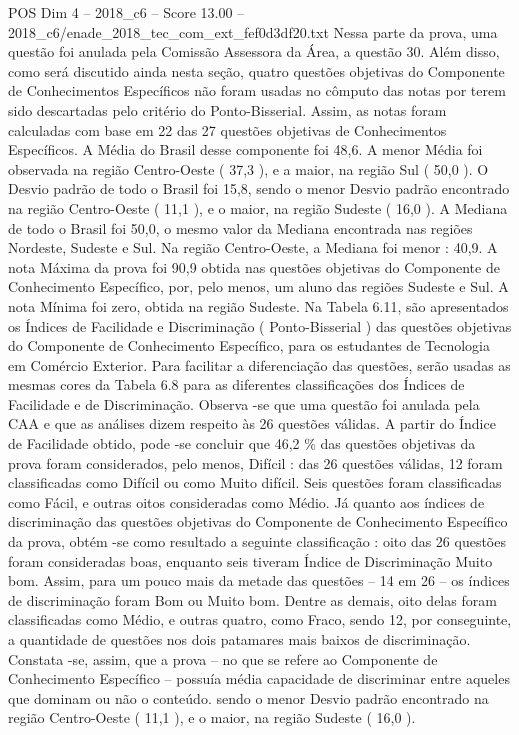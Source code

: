 \begin{textsample}{POS Dim 4 – 2018\_c6 – Score 13.00 – 2018\_c6/enade\_2018\_tec\_com\_ext\_fef0d3df20.txt}
Nessa parte da prova, uma questão foi anulada pela Comissão Assessora da Área, a questão 30.
Além disso, como será discutido ainda nesta seção, quatro questões objetivas do Componente de Conhecimentos Específicos não foram usadas no cômputo das notas por terem sido descartadas pelo critério do Ponto-Bisserial.
Assim, as notas foram calculadas com base em 22 das 27 questões objetivas de Conhecimentos Específicos.
A Média do Brasil desse componente foi 48,6.
A menor Média foi observada na região Centro-Oeste ( 37,3 ), e a maior, na região Sul ( 50,0 ).
O Desvio padrão de todo o Brasil foi 15,8, sendo o menor Desvio padrão encontrado na região Centro-Oeste ( 11,1 ), e o maior, na região Sudeste ( 16,0 ).
A Mediana de todo o Brasil foi 50,0, o mesmo valor da Mediana encontrada nas regiões Nordeste, Sudeste e Sul.
Na região Centro-Oeste, a Mediana foi menor : 40,9.
A nota Máxima da prova foi 90,9 obtida nas questões objetivas do Componente de Conhecimento Específico, por, pelo menos, um aluno das regiões Sudeste e Sul.
A nota Mínima foi zero, obtida na região Sudeste.
Na Tabela 6.11, são apresentados os Índices de Facilidade e Discriminação ( Ponto-Bisserial ) das questões objetivas do Componente de Conhecimento Específico, para os estudantes de Tecnologia em Comércio Exterior.
Para facilitar a diferenciação das questões, serão usadas as mesmas cores da Tabela 6.8 para as diferentes classificações dos Índices de Facilidade e de Discriminação.
Observa -se que uma questão foi anulada pela CAA e que as análises dizem respeito às 26 questões válidas.
A partir do Índice de Facilidade obtido, pode -se concluir que 46,2 \% das questões objetivas da prova foram considerados, pelo menos, Difícil : das 26 questões válidas, 12 foram classificadas como Difícil ou como Muito difícil.
Seis questões foram classificadas como Fácil, e outras oitos consideradas como Médio.
Já quanto aos índices de discriminação das questões objetivas do Componente de Conhecimento Específico da prova, obtém -se como resultado a seguinte classificação : oito das 26 questões foram consideradas boas, enquanto seis tiveram Índice de Discriminação Muito bom.
Assim, para um pouco mais da metade das questões – 14 em 26 – os índices de discriminação foram Bom ou Muito bom.
Dentre as demais, oito delas foram classificadas como Médio, e outras quatro, como Fraco, sendo 12, por conseguinte, a quantidade de questões nos dois patamares mais baixos de discriminação.
Constata -se, assim, que a prova – no que se refere ao Componente de Conhecimento Específico – possuía média capacidade de discriminar entre aqueles que dominam ou não o conteúdo. sendo o menor Desvio padrão encontrado na região Centro-Oeste ( 11,1 ), e o maior, na região Sudeste ( 16,0 ).

\end{textsample}
